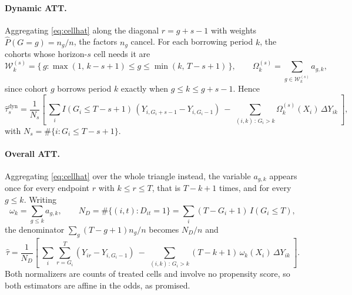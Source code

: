 \documentclass[12pt]{article}
\theoremstyle{remark}
\begin{document}
\paragraph{Dynamic ATT.} Aggregating \eqref{eq:cellhat} along the diagonal
$r = g + s - 1$ with weights $\widehat P(G{=}g) = n_g/n$, the factors $n_g$ cancel. For
each borrowing period $k$, the cohorts whose horizon-$s$ cell needs it are
\begin{equation}
\mathcal{W}^{(s)}_k = \big\{\, g : \max(1,\, k{-}s{+}1) \le g \le \min(k,\, T{-}s{+}1) \,\big\},
\qquad
\Omega^{(s)}_k = \sum_{g \in \mathcal{W}^{(s)}_k} a_{g,k},
\label{eq:window}
\end{equation}
since cohort $g$ borrows period $k$ exactly when $g \le k \le g+s-1$. Hence
\begin{equation}
\widehat\tau^{\mathrm{dyn}}_s
= \frac{1}{N_s}\left[\ \sum_i I(G_i \le T{-}s{+}1)\,(Y_{i,G_i+s-1} - Y_{i,G_i-1})
 \ -\ \sum_{(i,k)\,:\,G_i > k} \Omega^{(s)}_k(X_i)\,\Delta Y_{ik}\ \right],
\label{eq:dynhat}
\end{equation}
with $N_s = \#\{i : G_i \le T{-}s{+}1\}$.

\paragraph{Overall ATT.} Aggregating \eqref{eq:cellhat} over the whole triangle instead,
the variable $a_{g,k}$ appears once for every endpoint $r$ with $k \le r \le T$, that is
$T-k+1$ times, and for every $g \le k$. Writing
\begin{equation}
\omega_k = \sum_{g \le k} a_{g,k},
\qquad
N_D = \#\{(i,t) : D_{it} = 1\} = \sum_i (T - G_i + 1)\,I(G_i \le T),
\label{eq:omega}
\end{equation}
the denominator $\sum_g (T{-}g{+}1)n_g/n$ becomes $N_D/n$ and
\begin{equation}
\widehat\tau
= \frac{1}{N_D}\left[\ \sum_i \sum_{r = G_i}^{T} (Y_{ir} - Y_{i,G_i-1})
 \ -\ \sum_{(i,k)\,:\,G_i > k} (T{-}k{+}1)\,\omega_k(X_i)\,\Delta Y_{ik}\ \right].
\label{eq:overallhat}
\end{equation}
Both normalizers are counts of treated cells and involve no propensity score, so both
estimators are affine in the odds, as promised.
\end{document}
